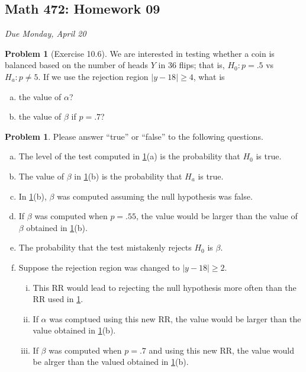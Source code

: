 \documentclass[10pt]{article}
\theoremstyle{definition}
\newtheorem{problem}[theorem]{Problem}
\newcommand{\1}[1]{\textbf{1}_{\left[#1\right]}} %
\begin{document}
\begin{center}
  \section*{Math 472: Homework 09}
  \textit{Due Monday, April 20}
\end{center}


\begin{problem}[Exercise 10.6]
  \label{problem:exercise-10.6}
  We are interested in testing whether a coin is balanced based on the number
  of heads $Y$ in 36 flips; that is, $H_{0}:p=.5$ vs $H_{a}:p\neq 5$. If we
  use the rejection region $|y-18| \geq 4$, what is
  \begin{enumerate}[(a)]
    \item the value of $\alpha$?
    \item the value of $\beta$ if $p=.7$?
  \end{enumerate}
\end{problem}


\begin{problem}
  Please answer ``true'' or ``false'' to the following questions.
  \begin{enumerate}[(a)]
    \item The level of the test computed in \cref{problem:exercise-10.6}(a) is
    the probability that $H_{0}$ is true.
    \item The value of $\beta$ in \cref{problem:exercise-10.6}(b) is the
    probability that $H_{a}$ is true.
    \item In \cref{problem:exercise-10.6}(b), $\beta$ was computed assuming
    the null hypothesis was false.
    \item If $\beta$ was computed when $p=.55$, the value would be larger than
    the value of $\beta$ obtained in \cref{problem:exercise-10.6}(b).
    \item The probability that the test mistakenly rejects $H_{0}$ is $\beta$. 
    \item Suppose the rejection region was changed to $\left| y-18 \right|
    \geq 2$.
    \begin{enumerate}[(i)]
      \item This RR would lead to rejecting the null hypothesis more often
      than the RR used in \cref{problem:exercise-10.6}.
      \item If $\alpha$ was comptued using this new RR, the value would be
      larger than the value obtained in \cref{problem:exercise-10.6}(b).
      \item If $\beta$ was computed when $p=.7$ and using this new RR, the
      value would be alrger than the valued obtained in
      \cref{problem:exercise-10.6}(b).
    \end{enumerate}
  \end{enumerate}
\end{problem}
\end{document}
